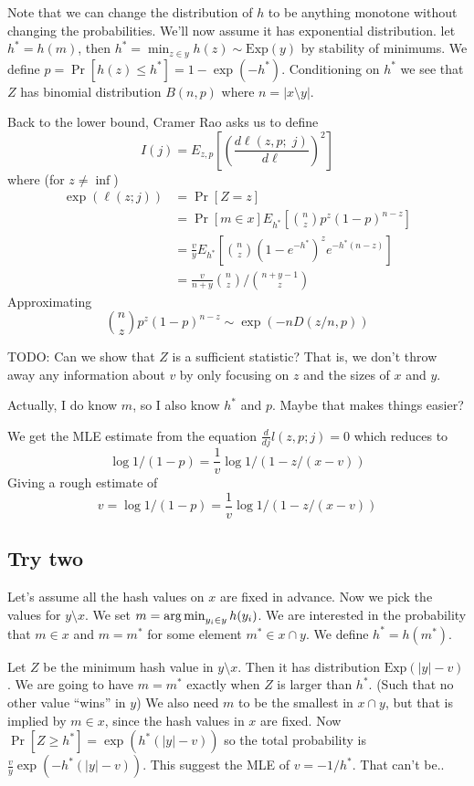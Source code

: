 Note that we can change the distribution of $h$ to be anything monotone without changing the probabilities.
We'll now assume it has exponential distribution.
let $h^* = h(m)$, then $h^* = \min_{z\in y}h(z) \sim \text{Exp}(y)$ by stability of minimums.
We define $p=\Pr[h(z)\le h^*] = 1-\exp(-h^*)$.
Conditioning on $h^*$ we see that $Z$ has binomial distribution $B(n,p)$ where $n=|x\setminus y|$.

Back to the lower bound, 
Cramer Rao asks us to define
\[
   I(j) = E_{z,p}\left[\left(\frac{d\ell(z,p;\; j)}{d\ell}\right)^2\right]
\]
where (for $z\not=\inf$)
\begin{align}
   \exp(\ell(z;j))
   &=\Pr[Z=z]
 \\&= \Pr[m\in x]E_{h^*}[\binom{n}{z}p^z(1-p)^{n-z}]
 \\&= \tfrac{v}{y}E_{h^*}[\binom{n}{z} (1-e^{-h^*})^z e^{-h^*(n-z)}]
 \\&= \frac{v}{n+y}\binom{n}{z}\bigg/\binom{n+y-1}{z}
\end{align}
Approximating
\[
   \binom{n}{z}p^z(1-p)^{n-z} \sim \exp(-n D(z/n, p))
\]


TODO: Can we show that $Z$ is a sufficient statistic?
That is, we don't throw away any information about $v$ by only focusing on $z$ and the sizes of $x$ and $y$.

Actually, I do know $m$, so I also know $h^*$ and $p$.
Maybe that makes things easier?

We get the MLE estimate from the equation $\frac{d}{dj}l(z,p;j)=0$
which reduces to
\[
   \log1/(1-p) = \frac1v\log1/(1-z/(x-v))
\]
Giving a rough estimate of
\[
   v = \log1/(1-p) = \frac1v\log1/(1-z/(x-v))
\]

\subsection{Try two}

Let's assume all the hash values on $x$ are fixed in advance.
Now we pick the values for $y\setminus x$.
We set $m=\operatorname*{arg\,min}_{y_i\in y} h(y_i)$.
We are interested in the probability that $m\in x$ and $m=m^*$ for some element $m^*\in x\cap y$.
We define $h^*=h(m^*)$.

Let $Z$ be the minimum hash value in $y\setminus x$. Then it has distribution $\text{Exp}(|y|-v)$.
We are going to have $m=m^*$ exactly when $Z$ is larger than $h^*$.
(Such that no other value ``wins'' in $y$)
We also need $m$ to be the smallest in $x\cap y$, but that is implied by $m\in x$, since the hash values in $x$ are fixed.
Now $\Pr[Z \ge h^*] = \exp(h^*(|y|-v))$
so the total probability is $\frac{v}{y}\exp(-h^*(|y|-v))$.
This suggest the MLE of $v=-1/h^*$.
That can't be..

